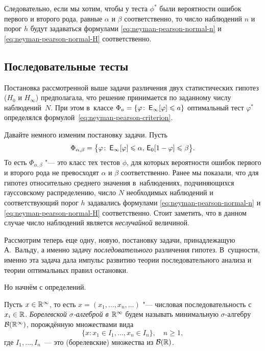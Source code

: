 \begin{example}
	Следовательно, если мы хотим, чтобы у теста \(\phi^{*}\) были вероятности 
	ошибок первого и второго рода, равные \(\alpha\) и \(\beta\) 
	соответственно, то число наблюдений \(n\) и порог \(h\) будут задаваться 
	формулами \eqref{eq:neyman-pearson-normal-n} и 
	\eqref{eq:neyman-pearson-normal-H} соответственно.
\end{example}

\subsection{Последовательные тесты}\label{sec-3}

Постановка рассмотренной выше задачи различения двух статистических гипотез ($H_{0}$ и 
$H_{\infty}$) предполагала, что решение принимается по заданному числу наблюдений~$N$. При 
этом в~классе $\Phi_{a}=\left\{\varphi\colon \E_{\infty}[\phi] \leq a\right\}$ оптимальный тест 
$\varphi^*$ определялся формулой~\eqref{eq:neyman-pearson-criterion}.

Давайте немного изменим постановку задачи. Пусть
\begin{equation}
	\Phi_{\alpha,\beta} = \bigl\{\phi \colon \E_{\infty}[\phi] \leq \alpha,\,\E_{0}[1 - \phi] \leq 
	\beta\bigr\}.
\end{equation}
То есть \(\Phi_{\alpha, \beta}\) "--- это класс тех тестов $\phi$, для которых вероятности ошибок 
первого и второго рода не превосходят $\alpha$ и $\beta$ соответственно. Ранее мы показали, что для 
гипотез относительно среднего значения в~наблюдениях, подчиняющихся гауссовскому распределению, 
число \(N\) необходимых наблюдений и соответствующий порог \(h\) задавались формулами  
\eqref{eq:neyman-pearson-normal-n} и \eqref{eq:neyman-pearson-normal-H} соответственно. Стоит 
заметить, что в данном случае число наблюдений является \emph{неслучайной} величиной.

Рассмотрим теперь еще одну, новую, постановку задачи, принадлежащую А.~Вальду, а именно задачу
\emph{последовательного} различения гипотез. В~сущности, именно эта задача дала импульс развитию 
теории последовательного анализа и теории оптимальных правил остановки.

Но начнём с определений.
\begin{definition}
	Пусть \(x \in \mathbb{R}^{\infty}\), то есть \(x = (x_{1}, \ldots, x_{n}, \ldots)\) "--- числовая 
	последовательность с \(x_{i} \in \mathbb{R}\). \emph{Борелевской \(\sigma\)-алгеброй в \(\mathbb{R}^{\infty}\)} 
	будем называть минимальную \(\sigma\)-алгебру \(\mathcal{B}(\mathbb{R}^{\infty})\), порождённую множествами вида
	\begin{equation}
		\{x \colon x_{1} \in I_{1}, \ldots, x_{n} \in I_{n}\}, \quad n \geq 1,
	\end{equation}
	где \(I_{1}, \ldots, I_{n}\)~--- это (борелевские) множества из \(\mathcal{B}(\mathbb{R})\). 
\end{definition}

